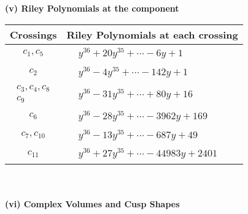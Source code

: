 \documentclass[1p]{elsarticle_modified}
\theoremstyle{definition}
\begin{document}
\newpage\renewcommand{\arraystretch}{1}
\flushleft \textbf{(v) Riley Polynomials at the component}\newline \\
\begin{tabular}{m{50pt}|m{274pt}}
Crossings & \hspace{64pt}Riley Polynomials at each crossing \\
\hline $$\begin{aligned}c_{1},c_{5}\end{aligned}$$&$\begin{aligned}
&y^{36}+20 y^{35}+\cdots-6 y+1
\end{aligned}$\\
\hline $$\begin{aligned}c_{2}\end{aligned}$$&$\begin{aligned}
&y^{36}-4 y^{35}+\cdots-142 y+1
\end{aligned}$\\
\hline $$\begin{aligned}c_{3},c_{4},c_{8}\\c_{9}\end{aligned}$$&$\begin{aligned}
&y^{36}-31 y^{35}+\cdots+80 y+16
\end{aligned}$\\
\hline $$\begin{aligned}c_{6}\end{aligned}$$&$\begin{aligned}
&y^{36}-28 y^{35}+\cdots-3962 y+169
\end{aligned}$\\
\hline $$\begin{aligned}c_{7},c_{10}\end{aligned}$$&$\begin{aligned}
&y^{36}-13 y^{35}+\cdots-687 y+49
\end{aligned}$\\
\hline $$\begin{aligned}c_{11}\end{aligned}$$&$\begin{aligned}
&y^{36}+27 y^{35}+\cdots-44983 y+2401
\end{aligned}$\\
\hline
\end{tabular}\\~\\
\newpage\flushleft \textbf{(vi) Complex Volumes and Cusp Shapes}
\end{document}
